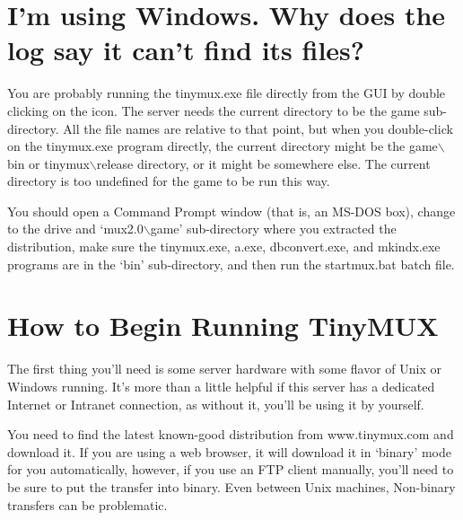 \documentclass[dvips]{book}
\begin{document}
\section{I'm using Windows. Why does the log say it can't find its files?}
You are probably running the tinymux.exe file directly from the GUI by double
clicking on the icon. The server needs the current directory to be the game
sub-directory. All the file names are relative to that point, but when you
double-click on the tinymux.exe program directly, the current directory might
be the game$\backslash$bin or tinymux$\backslash$release directory, or it
might be somewhere else.  The current directory is too undefined for the game
to be run this way.

You should open a Command Prompt window (that is, an MS-DOS box), change to
the drive and `mux2.0$\backslash$game' sub-directory where you extracted the
distribution, make sure the tinymux.exe, a.exe, dbconvert.exe, and mkindx.exe
programs are in the `bin' sub-directory, and then run the startmux.bat batch
file.
\section{How to Begin Running TinyMUX}
The first thing you'll need is some server hardware with some flavor of Unix or
Windows running. It's more than a little helpful if this server has a dedicated
Internet or Intranet connection, as without it, you'll be using it by yourself.

You need to find the latest known-good distribution from
www.tinymux.com and download it. If you are using a web browser, it will
download it in `binary' mode for you automatically, however, if you use an FTP
client manually, you'll need to be sure to put the transfer into binary. Even
between Unix machines, Non-binary transfers can be problematic.
\end{document}
